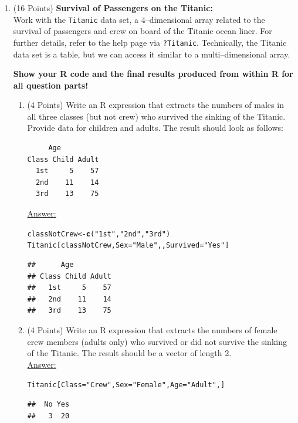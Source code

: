 \documentclass[12pt,letterpaper,final]{article}\usepackage[]{graphicx}\usepackage[]{xcolor}
\makeatletter
\newcommand{\hlstr}[1]{\textcolor[rgb]{0.192,0.494,0.8}{#1}}%
\newcommand{\hlstd}[1]{\textcolor[rgb]{0.345,0.345,0.345}{#1}}%
\newcommand{\hlkwb}[1]{\textcolor[rgb]{0.69,0.353,0.396}{#1}}%
\newcommand{\hlkwc}[1]{\textcolor[rgb]{0.333,0.667,0.333}{#1}}%
\newcommand{\hlkwd}[1]{\textcolor[rgb]{0.737,0.353,0.396}{\textbf{#1}}}%
\newenvironment{kframe}{%
 \def\at@end@of@kframe{}%
 \ifinner\ifhmode%
  \def\at@end@of@kframe{\end{minipage}}%
  \begin{minipage}{\columnwidth}%
 \fi\fi%
 \def\FrameCommand##1{\hskip\@totalleftmargin \hskip-\fboxsep
 \colorbox{shadecolor}{##1}\hskip-\fboxsep
     \hskip-\linewidth \hskip-\@totalleftmargin \hskip\columnwidth}%
 \MakeFramed {\advance\hsize-\width
   \@totalleftmargin\z@ \linewidth\hsize
   \@setminipage}}%
 {\par\unskip\endMakeFramed%
 \at@end@of@kframe}
\newenvironment{knitrout}{}{} %
\makeatother
\begin{document}
\begin{enumerate}
\begin{enumerate}
\end{enumerate}


\newpage


\item (16 Points) {\bf Survival of Passengers on the Titanic:} \\
Work with the \verb|Titanic| data set, a 4--dimensional array related
to the survival of passengers and crew on board of the Titanic ocean liner.
For further details, refer to the help page via \verb|?Titanic|.
Technically, the Titanic data set is a table, but we can access it similar
to a multi--dimensional array.

{\bf Show your R code and the final results produced from within R
for all question parts!}

\begin{enumerate}
\item (4 Points)
Write an R expression that extracts the numbers of males in all three classes (but not crew)
who survived the sinking of the Titanic. Provide data for children and adults.
The result should look as follows:
\begin{verbatim}
     Age
Class Child Adult
  1st     5    57
  2nd    11    14
  3rd    13    75
\end{verbatim}

\underline{Answer:}
\begin{knitrout}
\color{fgcolor}\begin{kframe}
\begin{alltt}
\hlstd{classNotCrew} \hlkwb{<-} \hlkwd{c}\hlstd{(}\hlstr{"1st"}\hlstd{,} \hlstr{"2nd"}\hlstd{,} \hlstr{"3rd"}\hlstd{)}
\hlstd{Titanic[classNotCrew,}\hlkwc{Sex} \hlstd{=} \hlstr{"Male"}\hlstd{,,}\hlkwc{Survived} \hlstd{=} \hlstr{"Yes"}\hlstd{]}
\end{alltt}
\begin{verbatim}
##      Age
## Class Child Adult
##   1st     5    57
##   2nd    11    14
##   3rd    13    75
\end{verbatim}
\end{kframe}
\end{knitrout}


\item (4 Points)
Write an R expression that extracts the numbers of female crew members (adults only)
who survived or did not survive the sinking of the Titanic. 
The result should be a vector of length 2. \\

\underline{Answer:}
\begin{knitrout}
\color{fgcolor}\begin{kframe}
\begin{alltt}
\hlstd{Titanic[}\hlkwc{Class} \hlstd{=} \hlstr{"Crew"}\hlstd{,} \hlkwc{Sex} \hlstd{=} \hlstr{"Female"}\hlstd{,} \hlkwc{Age} \hlstd{=} \hlstr{"Adult"}\hlstd{,]}
\end{alltt}
\begin{verbatim}
##  No Yes 
##   3  20
\end{verbatim}
\end{kframe}
\end{knitrout}



\end{enumerate}
\end{enumerate}
\end{document}
